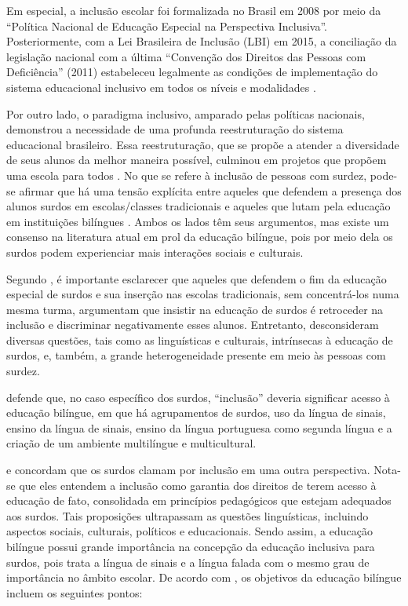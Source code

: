 Em especial, a inclusão escolar foi formalizada no Brasil em 2008 por meio da ``Política Nacional de Educação Especial na Perspectiva Inclusiva''. Posteriormente, com a Lei Brasileira de Inclusão (LBI) em 2015, a conciliação da legislação nacional com a última ``Convenção dos Direitos das Pessoas com Deficiência'' (2011) estabeleceu legalmente as condições de implementação do sistema educacional inclusivo em todos os níveis e modalidades \cite{Alana2019}.

Por outro lado, o paradigma inclusivo, amparado pelas políticas nacionais, demonstrou a necessidade de uma profunda reestruturação do sistema educacional brasileiro. Essa reestruturação, que se propõe a atender a diversidade de seus alunos da melhor maneira possível, culminou em projetos que propõem uma escola para todos \cite{Almeida2015}. No que se refere à inclusão de pessoas com surdez, pode-se afirmar que há uma tensão explícita entre aqueles que defendem a presença dos alunos surdos em escolas/classes tradicionais e aqueles que lutam pela educação em instituições bilíngues \cite{Almeida2015,Quadros2019}. Ambos os lados têm seus argumentos, mas existe um consenso na literatura atual em prol da educação bilíngue, pois por meio dela os surdos podem experienciar mais interações sociais e culturais. 

Segundo , é importante esclarecer que aqueles que defendem o fim da educação especial de surdos e sua inserção nas escolas tradicionais, sem concentrá-los numa mesma turma, argumentam que insistir na educação de surdos é retroceder na inclusão e discriminar negativamente esses alunos. Entretanto, desconsideram diversas questões, tais como as linguísticas e culturais, intrínsecas à educação de surdos, e, também, a grande heterogeneidade presente em meio às pessoas com surdez.%

 defende que, no caso específico dos surdos, ``inclusão'' deveria significar acesso à educação bilíngue, em que há agrupamentos de surdos, uso da língua de sinais, ensino da língua de sinais, ensino da língua portuguesa como segunda língua e a criação de um ambiente multilíngue e multicultural.

 e  concordam que os surdos clamam por inclusão em uma outra perspectiva. Nota-se que eles entendem a inclusão como garantia dos direitos de terem acesso à educação de fato, consolidada em princípios pedagógicos que estejam adequados aos surdos. Tais proposições ultrapassam as questões linguísticas, incluindo aspectos sociais, culturais, políticos e educacionais. Sendo assim, a educação bilíngue possui grande importância na concepção da educação inclusiva para surdos, pois trata a língua de sinais e a língua falada com o mesmo grau de importância no âmbito escolar. De acordo com , os objetivos da educação bilíngue incluem os seguintes pontos:

